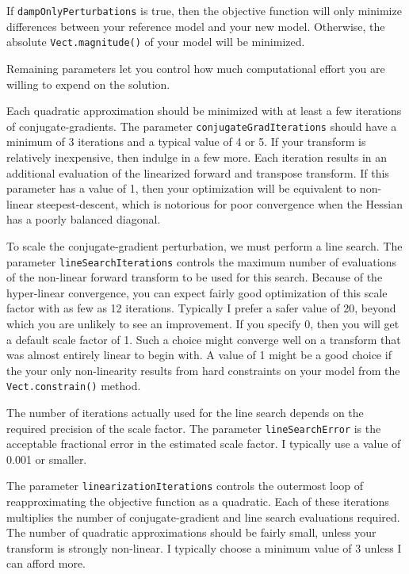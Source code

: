\documentclass[12pt]{article}
\begin{document}
If \texttt{dampOnlyPerturbations} is true,
then the objective function will only
minimize differences between your reference
model and your new model.  Otherwise, the
absolute \texttt{Vect.magnitude()} of your
model will be minimized.

Remaining parameters let you control how much
computational effort you are willing to
expend on the solution.

Each quadratic approximation should be
minimized with at least a few iterations of
conjugate-gradients.  The parameter
\texttt{conjugateGradIterations} should have
a minimum of 3 iterations and a typical value
of 4 or 5.  If your transform is relatively
inexpensive, then indulge in a few more.
Each iteration results in an additional
evaluation of the linearized forward and
transpose transform.  If this parameter has a
value of 1, then your optimization will be
equivalent to non-linear steepest-descent,
which is notorious for poor convergence when
the Hessian has a poorly balanced diagonal.

To scale the conjugate-gradient perturbation,
we must perform a line search.  The parameter
\texttt{lineSearchIterations} controls the
maximum number of evaluations of the
non-linear forward transform to be used for
this search.  Because of the hyper-linear
convergence, you can expect fairly good
optimization of this scale factor with as few
as 12 iterations.  Typically I prefer a safer
value of 20, beyond which you are unlikely to
see an improvement.  If you specify 0, then
you will get a default scale factor of 1.
Such a choice might converge well on a
transform that was almost entirely linear to
begin with.  A value of 1 might be a good
choice if the your only non-linearity results
from hard constraints on your model from the
\texttt{Vect.constrain()} method.

The number of iterations actually used for
the line search depends on the required
precision of the scale factor.  The parameter
\texttt{lineSearchError} is the acceptable
fractional error in the estimated scale
factor.  I typically use a value of 0.001 or
smaller.

The parameter
\texttt{linearizationIterations} controls the
outermost loop of reapproximating the
objective function as a quadratic.  Each of
these iterations multiplies the number of
conjugate-gradient and line search
evaluations required.  The number of
quadratic approximations should be fairly
small, unless your transform is strongly
non-linear.  I typically choose a minimum
value of 3 unless I can afford more.
\end{document}
